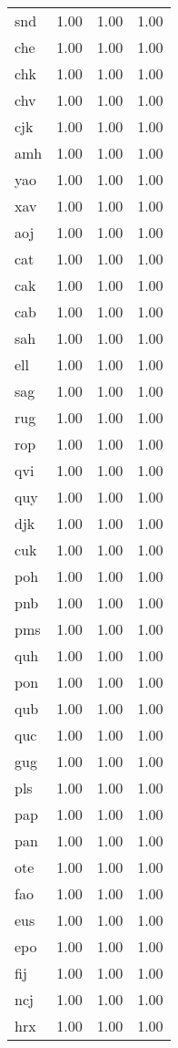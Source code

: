 \begin{table}
\begin{tabular}{lrrr}
snd & 1.00 & 1.00 & 1.00 \\
che & 1.00 & 1.00 & 1.00 \\
chk & 1.00 & 1.00 & 1.00 \\
chv & 1.00 & 1.00 & 1.00 \\
cjk & 1.00 & 1.00 & 1.00 \\
amh & 1.00 & 1.00 & 1.00 \\
yao & 1.00 & 1.00 & 1.00 \\
xav & 1.00 & 1.00 & 1.00 \\
aoj & 1.00 & 1.00 & 1.00 \\
cat & 1.00 & 1.00 & 1.00 \\
cak & 1.00 & 1.00 & 1.00 \\
cab & 1.00 & 1.00 & 1.00 \\
sah & 1.00 & 1.00 & 1.00 \\
ell & 1.00 & 1.00 & 1.00 \\
sag & 1.00 & 1.00 & 1.00 \\
rug & 1.00 & 1.00 & 1.00 \\
rop & 1.00 & 1.00 & 1.00 \\
qvi & 1.00 & 1.00 & 1.00 \\
quy & 1.00 & 1.00 & 1.00 \\
djk & 1.00 & 1.00 & 1.00 \\
cuk & 1.00 & 1.00 & 1.00 \\
poh & 1.00 & 1.00 & 1.00 \\
pnb & 1.00 & 1.00 & 1.00 \\
pms & 1.00 & 1.00 & 1.00 \\
quh & 1.00 & 1.00 & 1.00 \\
pon & 1.00 & 1.00 & 1.00 \\
qub & 1.00 & 1.00 & 1.00 \\
quc & 1.00 & 1.00 & 1.00 \\
gug & 1.00 & 1.00 & 1.00 \\
pls & 1.00 & 1.00 & 1.00 \\
pap & 1.00 & 1.00 & 1.00 \\
pan & 1.00 & 1.00 & 1.00 \\
ote & 1.00 & 1.00 & 1.00 \\
fao & 1.00 & 1.00 & 1.00 \\
eus & 1.00 & 1.00 & 1.00 \\
epo & 1.00 & 1.00 & 1.00 \\
fij & 1.00 & 1.00 & 1.00 \\
ncj & 1.00 & 1.00 & 1.00 \\
hrx & 1.00 & 1.00 & 1.00 \\

\end{tabular}
\end{table}
